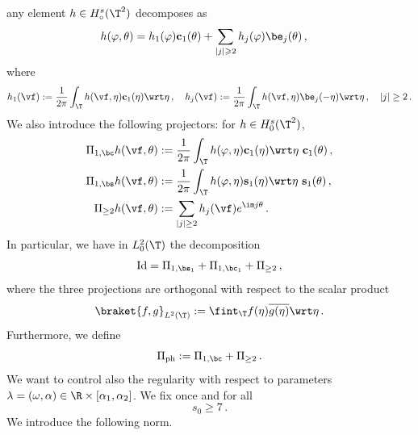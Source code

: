 \documentclass[a4paper,reqno,10pt]{article}
\begin{document}
any element $h\in H^{s}_{\circ}(\T^2)$ decomposes as
\begin{align}
h(\varphi,\theta)
&=h_1(\varphi) {\bf{c}}_1(\theta)+\sum_{|j|\geqslant 2}h_j(\varphi) \be_{j}(\theta)\,,
\end{align}
where
\begin{equation}\label{coeff.ph}
    h_{1}(\vf) := \frac{1}{2\pi} \int_{\T} h(\vf,\eta) {\bf{c}}_1(\eta) \wrt\eta \,, \quad h_{j}(\vf):= \frac{1}{2\pi} \int_{\T} h(\vf,\eta) \be_{j}(-\eta) \wrt\eta\,, \quad |j|\geq 2 \,.
\end{equation}
We also introduce the following projectors: for $h\in H_0^s(\T^2)$,
\begin{align}
 \Pi_{1,\bc}h(\vf,\theta) &:=\frac{1}{2\pi}\int_{\T}h(\varphi,\eta) {\bf{c}}_1(\eta)\wrt \eta\,\, {\bf{c}}_1(\theta) \,, \label{proj.1c} \\
 \Pi_{1,\bs}h(\vf,\theta) & :=\frac{1}{2\pi}\int_{\T}h(\varphi,\eta) {\bf{s}}_1(\eta)\wrt\eta\,\, {\bf{s}}_1(\theta) \,, \label{proj.1s} \\
 \Pi_{\geq 2} h(\vf,\theta) & := \sum_{|j|\geq 2} h_{j}(\vf) e^{\im j \theta} \,.\label{proj.geq2}
 \end{align}
 In particular, we have in $L_0^{2}(\T)$ the decomposition
 \begin{equation}
     {\rm Id} = \Pi_{1,\bs_{1}} + \Pi_{1,\bc_{1}} + \Pi_{\geq 2} \,,
 \end{equation}
 where the three projections are orthogonal with respect to the scalar product
 \begin{equation}\label{scalar.prod.L2}
     \braket{f,g}_{L^2(\T)}:= \fint_{\T} f(\eta) \overline{g(\eta)} \wrt\eta \,.
 \end{equation}
Furthermore, we define
\begin{equation}\label{proj.ph}
    \Pi_{\rm ph} := \Pi_{1,\bc} + \Pi_{\geq 2} \,.
\end{equation}
We want to control also the regularity with respect to parameters $\lambda =(\omega,\alpha)\in  \R \times  [\alpha_{1},\alpha_{2}]$. 
We fix once and for all
\begin{equation}\label{s0-embed}
    s_0 \geq  7 \,.
\end{equation}
We introduce the following norm.
\end{document}
